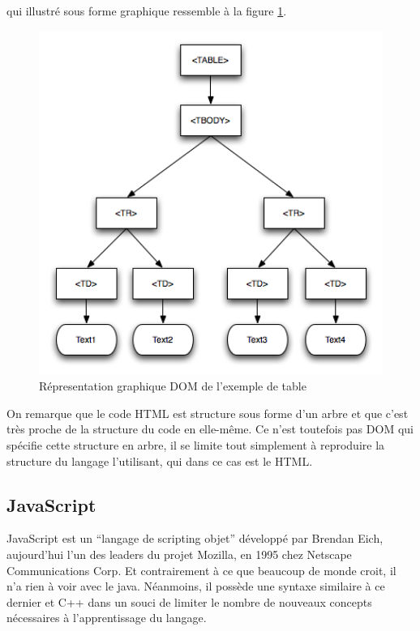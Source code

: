 \documentclass[10pt,a4paper,titlepage]{article}
\begin{document}
qui illustré sous forme graphique ressemble à la figure \ref{dom1}.

\begin{figure}[h]
	\begin{center}
			\includegraphics[width=12cm]{img/exempleDOM.png}
			\caption{Répresentation graphique DOM de l'exemple de table}
			\label{dom1}
	\end{center}
\end{figure}

On remarque que le code HTML est structure sous forme d'un arbre et que c'est très proche de la structure du code en elle-même. Ce n'est toutefois pas DOM qui spécifie cette structure en arbre, il se limite tout simplement à reproduire la structure du langage l'utilisant, qui dans ce cas est le HTML.

\subsection{JavaScript}
JavaScript est un “langage de scripting objet” développé par Brendan Eich, aujourd'hui l'un des leaders du projet Mozilla, en 1995 chez Netscape Communications Corp. Et contrairement à ce que beaucoup de monde croit, il n'a rien à voir avec le java. Néanmoins, il possède une syntaxe similaire à ce dernier et C++ dans un souci de limiter le nombre de nouveaux concepts nécessaires à l'apprentissage du langage.\\
\end{document}
